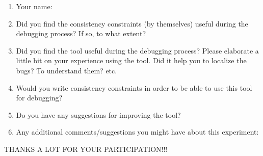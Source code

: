 \documentclass{article}
\title{}
\author{Debugging experiment - Exit survey for population 2}
\date{July 30, 2003}
\begin{document}
\maketitle
\begin{flushleft}
\vspace{0.5in}

\thispagestyle{empty}

\begin{enumerate}
\item{Your name:}
\item{Did you find the consistency constraints (by themselves) useful during the debugging process?  If so, to what extent?\vspace{0.3in}}
\item{Did you find the tool useful during the debugging process?  Please elaborate a little bit on your experience using the tool.  Did it help you to localize the bugs?  To understand them?  etc.\vspace{1.2in}}
\item{Would you write consistency constraints in order to be able to use this tool for debugging?\vspace{0.3in}}
\item{Do you have any suggestions for improving the tool?\vspace{0.5in}}
\item{Any additional comments/suggestions you might have about this experiment:}
\end{enumerate}


\vspace{2.5in}
\begin{center}
THANKS A LOT FOR YOUR PARTICIPATION!!!
\end{center}

\end{flushleft}
\end{document}
